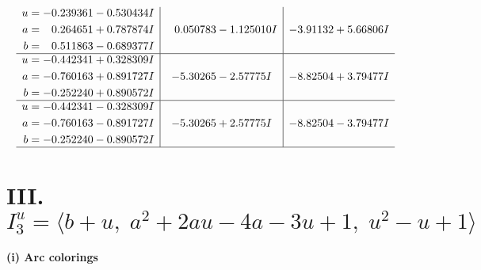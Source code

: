 \documentclass[1p]{elsarticle_modified}
\theoremstyle{definition}
\begin{document}
$$\begin{array}{c|c|c}
\begin{aligned}
u &= -0.239361 - 0.530434 I \\
a &= \phantom{-}0.264651 + 0.787874 I \\
b &= \phantom{-}0.511863 - 0.689377 I\end{aligned}
 & \phantom{-}0.050783 - 1.125010 I & -3.91132 + 5.66806 I \\ \hline\begin{aligned}
u &= -0.442341 + 0.328309 I \\
a &= -0.760163 + 0.891727 I \\
b &= -0.252240 + 0.890572 I\end{aligned}
 & -5.30265 - 2.57775 I & -8.82504 + 3.79477 I \\ \hline\begin{aligned}
u &= -0.442341 - 0.328309 I \\
a &= -0.760163 - 0.891727 I \\
b &= -0.252240 - 0.890572 I\end{aligned}
 & -5.30265 + 2.57775 I & -8.82504 - 3.79477 I\\
 \hline 
 \end{array}$$\newpage\newpage\renewcommand{\arraystretch}{1}
\centering \section*{III. $I^u_{3}= \langle b+u,\;a^2+2 a u-4 a-3 u+1,\;u^2- u+1 \rangle$}
\flushleft \textbf{(i) Arc colorings}\\
\end{document}
